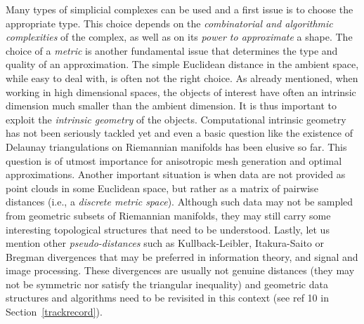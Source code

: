  Many types of simplicial complexes can be used and a first issue is to choose the appropriate type. This choice depends on the {\em combinatorial and algorithmic complexities} of the complex, as well as on its {\em power to approximate} a shape.
 The choice of a {\em metric} is another  fundamental issue 
that determines the type and quality of an approximation.
 The simple Euclidean distance in the ambient space, while easy to deal with, is often not the right choice.  As already mentioned, when working in high dimensional spaces, the objects of interest have often an intrinsic dimension much smaller than the ambient dimension. It is thus important to exploit the {\em intrinsic geometry} of the objects. Computational intrinsic geometry has not been seriously tackled yet and even a basic question like the existence of  Delaunay triangulations on Riemannian manifolds has been elusive so far.  This question is of utmost importance for anisotropic mesh generation and optimal approximations. Another important situation is when data are not provided as  point clouds in some Euclidean space, but rather as a matrix of pairwise distances (i.e., a {\em discrete metric space}). Although such data may not be sampled from geometric subsets of Riemannian manifolds, they may still carry some interesting topological structures that need to be understood. 
Lastly, let us mention other {\em pseudo-distances} such as
Kullback-Leibler, Itakura-Saito or Bregman divergences that may be
preferred in information theory, and signal and image processing.
 These divergences are usually not genuine distances (they may not be symmetric nor satisfy the triangular inequality) and  geometric data structures and algorithms need to be revisited in this context (see ref 10 in Section~\ref{trackrecord}).%


\vspace{-3mm}


